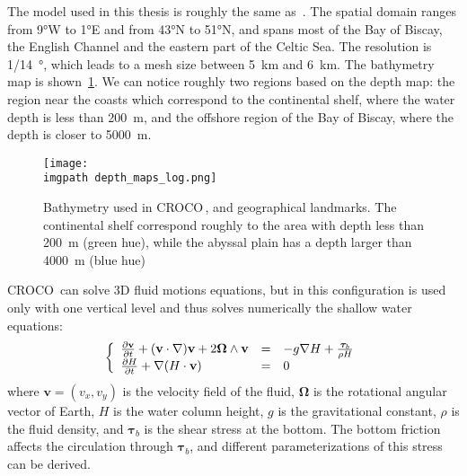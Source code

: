 \documentclass[../../Main_ManuscritThese.tex]{subfiles}
\newcommand{\CROCO}{CROCO\,}
\newcommand\imgpath{/home/victor/acadwriting/Manuscrit/Text/Chapter5/img/}
\begin{document}
The model used in this thesis is roughly the same
as~\cite{boutet_estimation_2015}. The spatial domain ranges from
\ang{9}W to \ang{1}E and from \ang{43}N to \ang{51}N, and spans most
of the Bay of Biscay, the English Channel and the eastern part of the
Celtic Sea.  The resolution is \SI{1/14}{\degree}, which leads to a
mesh size between \SI{5}{\kilo\metre} and \SI{6}{\kilo\metre}. The
bathymetry map is shown~\cref{fig:depth_maps}. We can notice roughly
two regions based on the depth map: the region near the coasts which
correspond to the continental shelf, where the water depth is less
than \SI{200}{\meter}, and the offshore region of the Bay of Biscay,
where the depth is closer to \SI{5000}{\meter}.
\begin{figure}[ht]
  \centering
  \texttt{[image: \\imgpath depth\_maps\_log.png]}
  \caption{\label{fig:depth_maps} Bathymetry used in \CROCO, and
    geographical landmarks. The continental shelf correspond roughly
    to the area with depth less than \SI{200}{\meter} (green hue),
    while the abyssal plain has a depth larger than \SI{4000}{\meter}
    (blue hue)}
\end{figure}
\CROCO{} can solve 3D fluid motions equations, but in this configuration
is used only with one vertical level and thus solves numerically the
shallow water equations:
\begin{align}
  \left\{
  \begin{array}{lll}
     \frac{\partial \mathbf{v}}{\partial t} + (\mathbf{v} \cdot \nabla )\mathbf{v} + 2 \bm{\Omega} \wedge \mathbf{v} &=& -g\nabla H + \frac{\bm{\tau}_b}{\rho H} \\
    \frac{\partial H}{\partial t} + \nabla (H \cdot \mathbf{v}) &=& 0
  \end{array}
   \right.
\end{align}
where $\mathbf{v} = (v_x,v_y)$ is the velocity field of the fluid,
$\bm{\Omega}$ is the rotational angular vector of Earth, $H$ is the
water column height, $g$ is the gravitational constant, $\rho$ is the
fluid density, and $\bm{\tau}_b$ is the shear stress at the
bottom. The bottom friction affects the circulation through
$\bm{\tau}_b$, and different parameterizations of this stress can be
derived.
\end{document}
